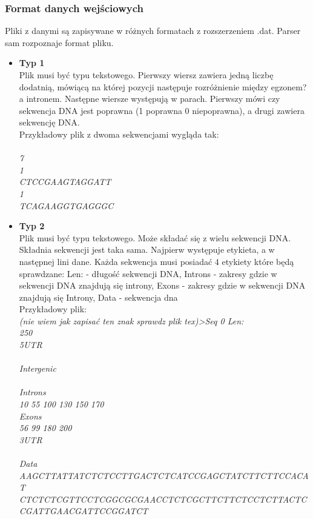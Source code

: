 \documentclass[a4size,final]{article}
\begin{document}
\subsubsection{Format danych wejściowych}
Pliki z danymi są zapisywane w różnych formatach z rozszerzeniem .dat. Parser sam rozpoznaje format pliku.
\begin{itemize}
\item \textbf{Typ 1}\\
	Plik musi być typu tekstowego. Pierwszy wiersz zawiera jedną liczbę dodatnią, mówiącą na której pozycji następuje rozróżnienie między egzonem? a intronem. Następne wiersze występują w parach. Pierwszy mówi czy sekwencja DNA jest poprawna (1 poprawna 0 niepoprawna), a drugi zawiera sekwencję DNA.\\
Przykładowy plik z dwoma sekwencjami wygląda tak:\\ \\
\emph{7\\1\\CTCCGAAGTAGGATT\\1\\TCAGAAGGTGAGGGC}
\item \textbf{Typ 2}\\
Plik musi być typu tekstowego. Może składać się z wielu sekwencji DNA. Składnia sekwencji jest taka sama. Najpierw występuje etykieta, a w następnej lini dane. Każda sekwencja musi posiadać 4 etykiety które będą sprawdzane: Len: - długość sekwencji DNA, Introns - zakresy gdzie w sekwencji DNA znajdują się introny, Exons - zakresy gdzie w sekwencji DNA znajdują się Introny, Data - sekwencja dna\\
Przykładowy plik:\\
\emph{(nie wiem jak zapisać ten znak sprawdz plik tex)>Seq 0 Len:\\250\\5UTR\\\\Intergenic\\\\Introns\\ 10 55 100 130 150 170\\Exons\\ 56 99 180 200\\3UTR\\\\Data\\AAGCTTATTATCTCTCCTTGACTCTCATCCGAGCTATCTTCTTCCACAT\\
CTCTCTCGTTCCTCGGCGCGAACCTCTCGCTTCTTCTCCTCTTACTCCGATTGAACGATTCCGGATCT\\
}
\end{itemize}
\end{document}
